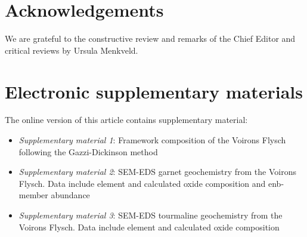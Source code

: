 \documentclass[twoside]{article}
\begin{document}
\section*{Acknowledgements}

We are grateful to the constructive review and remarks of the Chief Editor and critical reviews by Ursula Menkveld.\par

\section*{Electronic supplementary materials}

The online version of this article contains supplementary material:
\begin{itemize}
 \item \emph{Supplementary material 1}: Framework composition of the Voirons Flysch following the Gazzi-Dickinson method
 \item \emph{Supplementary material 2}: SEM-EDS garnet geochemistry from the Voirons Flysch. Data include element and calculated oxide composition and enb-member abundance
 \item \emph{Supplementary material 3}: SEM-EDS tourmaline geochemistry from the Voirons Flysch. Data include element and calculated oxide composition
\end{itemize}



\end{document}
